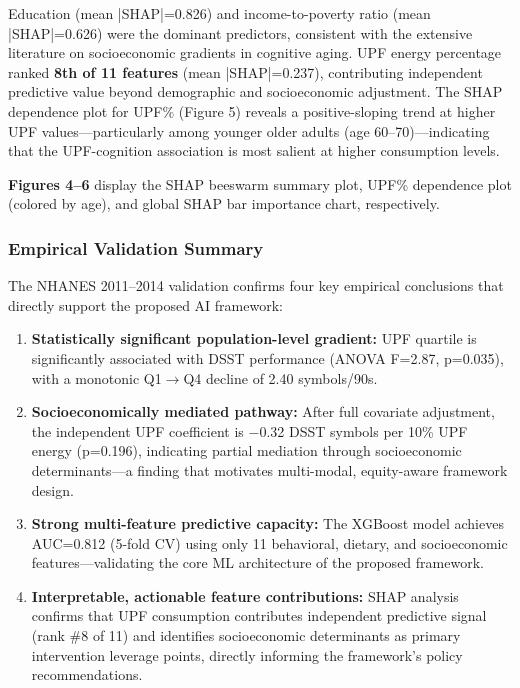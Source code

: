 \documentclass[journal,twoside,10pt]{IEEEtran}
\begin{document}
Education (mean |SHAP|=0.826) and income-to-poverty ratio (mean |SHAP|=0.626) were the dominant predictors, consistent with the extensive literature on socioeconomic gradients in cognitive aging. UPF energy percentage ranked \textbf{8th of 11 features} (mean |SHAP|=0.237), contributing independent predictive value beyond demographic and socioeconomic adjustment. The SHAP dependence plot for UPF\% (Figure 5) reveals a positive-sloping trend at higher UPF values---particularly among younger older adults (age 60--70)---indicating that the UPF-cognition association is most salient at higher consumption levels.

\textbf{Figures 4--6} display the SHAP beeswarm summary plot, UPF\% dependence plot (colored by age), and global SHAP bar importance chart, respectively.

\subsubsection{Empirical Validation Summary}

The NHANES 2011--2014 validation confirms four key empirical conclusions that directly support the proposed AI framework:

\begin{enumerate}
\item \textbf{Statistically significant population-level gradient:} UPF quartile is significantly associated with DSST performance (ANOVA F=2.87, p=0.035), with a monotonic Q1$\rightarrow$Q4 decline of 2.40 symbols/90s.
\item \textbf{Socioeconomically mediated pathway:} After full covariate adjustment, the independent UPF coefficient is $-$0.32 DSST symbols per 10\% UPF energy (p=0.196), indicating partial mediation through socioeconomic determinants---a finding that motivates multi-modal, equity-aware framework design.
\item \textbf{Strong multi-feature predictive capacity:} The XGBoost model achieves AUC=0.812 (5-fold CV) using only 11 behavioral, dietary, and socioeconomic features---validating the core ML architecture of the proposed framework.
\item \textbf{Interpretable, actionable feature contributions:} SHAP analysis confirms that UPF consumption contributes independent predictive signal (rank \#8 of 11) and identifies socioeconomic determinants as primary intervention leverage points, directly informing the framework's policy recommendations.
\end{enumerate}
\end{document}
